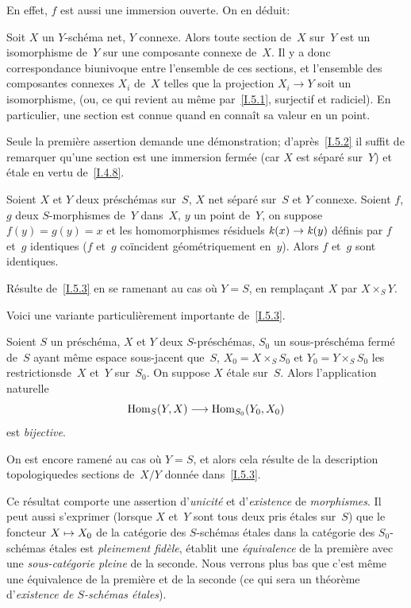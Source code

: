 En effet, $f$ est aussi une immersion ouverte. On en d\'eduit:

\begin{corollaire}
\label{I.5.3}
Soit
$X$ un $Y$-sch\'ema net, $Y$ connexe. Alors toute section
de~$X$ sur~$Y$ est un isomorphisme de~$Y$ sur une composante connexe
de~$X$. Il y a donc correspondance biunivoque entre l'ensemble de ces
sections, et l'ensemble des composantes connexes $X_i$ de~$X$ telles
que la projection $X_i \to Y$ soit un isomorphisme, (ou, ce qui
revient au m\^eme par~\ref{I.5.1}, surjectif et radiciel). En
particulier, une section est connue quand en conna\^it sa valeur en
un point.
\end{corollaire}

Seule la premi\`ere assertion demande une d\'emonstration;
d'apr\`es~\ref{I.5.2} il suffit de remarquer qu'une section est une
immersion ferm\'ee (car $X$ est s\'epar\'e sur~$Y$) et \'etale
en vertu de~\ref{I.4.8}.

\begin{corollaire}
\label{I.5.4}
Soient $X$ et $Y$ deux pr\'esch\'emas sur~$S$, $X$ net
s\'epar\'e sur~$S$ et $Y$ connexe. Soient $f$, $g$ deux
$S$-morphismes de~$Y$ dans~$X$, $y$ un point de~$Y$, on suppose $f(y)
= g(y) = x$ et les homomorphismes r\'esiduels $\kres(x) \to \kres(y)$
d\'efinis par $f$ et~$g$ identiques (\og $f$ et~$g$ co\"incident
g\'eom\'etriquement en~$y$\fg). Alors $f$ et~$g$ sont identiques.
\end{corollaire}

R\'esulte de~\ref{I.5.3} en se ramenant au cas o\`u $Y=S$, en
rempla\c cant $X$ par $X \times_S Y$.

Voici une variante particuli\`erement importante de~\ref{I.5.3}.

\begin{theoreme}
\label{I.5.5}
Soient $S$ un pr\'esch\'ema, $X$ et $Y$ deux
$S$-pr\'esch\'emas, $S_0$ un sous-pr\'esch\'ema ferm\'e
de~$S$ ayant m\^eme espace sous-jacent que~$S$, $X_0 = X \times_S
S_0$ et $Y_0 = Y \times_S S_0$ les \og restrictions\fg de~$X$ et~$Y$
sur~$S_0$. On suppose $X$ \'etale sur~$S$. Alors l'application
naturelle
$$
\Hom_S(Y,X) \to \Hom_{S_0}(Y_0,X_0)
$$
est \emph{bijective}.
\end{theoreme}

On est encore ramen\'e au cas o\`u $Y=S$, et alors cela
r\'esulte de la description \og topologique\fg des sections de~$X/Y$
donn\'ee dans~\ref{I.5.3}.

\begin{scholiestar}
Ce r\'esultat comporte une assertion d'\emph{unicité} et
d'\emph{existence} de \emph{morphismes}. Il peut aussi s'exprimer
(lorsque $X$ et~$Y$ sont tous deux pris \'etales sur~$S$) que le
foncteur $X \mto X_0$ de la cat\'egorie des $S$-sch\'emas
\'etales dans la cat\'egorie des $S_0$-sch\'emas \'etales est
\emph{pleinement fidèle}, \ie \'etablit une
\emph{équivalence} de la premi\`ere avec une
\emph{sous-catégorie pleine} de la seconde. Nous verrons plus bas
que c'est m\^eme une \'equivalence de la premi\`ere et de la
seconde (ce qui sera un th\'eor\`eme d'\emph{existence de
$S$-schémas étales}).
\end{scholiestar}

